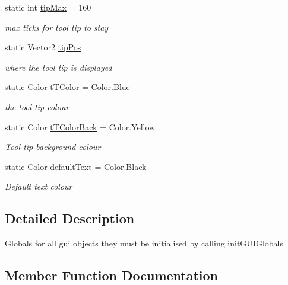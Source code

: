 \begin{DoxyCompactItemize}
static int \mbox{\hyperlink{class_r_c___framework_1_1_g_u_i___globals_a7907ea8884a57d97bcdffe3ea0f93d07}{tip\+Max}} = 160
\begin{DoxyCompactList}\small\item\em max ticks for tool tip to stay \end{DoxyCompactList}\item 
static Vector2 \mbox{\hyperlink{class_r_c___framework_1_1_g_u_i___globals_a24e7b231c578228af8acefde92c5a4e3}{tip\+Pos}}
\begin{DoxyCompactList}\small\item\em where the tool tip is displayed \end{DoxyCompactList}\item 
static Color \mbox{\hyperlink{class_r_c___framework_1_1_g_u_i___globals_a22e887d900112f523014dfce318790ec}{t\+T\+Color}} = Color.\+Blue
\begin{DoxyCompactList}\small\item\em the tool tip colour \end{DoxyCompactList}\item 
static Color \mbox{\hyperlink{class_r_c___framework_1_1_g_u_i___globals_a7a429140fceba1fe5b940216f9af4284}{t\+T\+Color\+Back}} = Color.\+Yellow
\begin{DoxyCompactList}\small\item\em Tool tip background colour \end{DoxyCompactList}\item 
static Color \mbox{\hyperlink{class_r_c___framework_1_1_g_u_i___globals_ab42b7596d505bafeb6d99d8a05143f11}{default\+Text}} = Color.\+Black
\begin{DoxyCompactList}\small\item\em Default text colour \end{DoxyCompactList}\end{DoxyCompactItemize}


\subsection{Detailed Description}
Globals for all gui objects they must be initialised by calling init\+G\+U\+I\+Globals 



\subsection{Member Function Documentation}
\mbox{\label{class_r_c___framework_1_1_g_u_i___globals_aee2de3108c9a937aaef3f152012eee9b}} 
